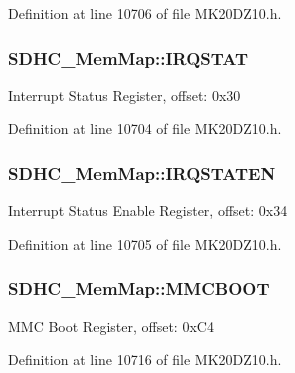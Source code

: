 Definition at line 10706 of file M\+K20\+D\+Z10.\+h.

\subsubsection[{\texorpdfstring{I\+R\+Q\+S\+T\+AT}{IRQSTAT}}]{ S\+D\+H\+C\+\_\+\+Mem\+Map\+::\+I\+R\+Q\+S\+T\+AT}\hypertarget{struct_s_d_h_c___mem_map_accf3cc2723054bbe32bb641e670d19e3}{}\label{struct_s_d_h_c___mem_map_accf3cc2723054bbe32bb641e670d19e3}
Interrupt Status Register, offset\+: 0x30 

Definition at line 10704 of file M\+K20\+D\+Z10.\+h.

\subsubsection[{\texorpdfstring{I\+R\+Q\+S\+T\+A\+T\+EN}{IRQSTATEN}}]{ S\+D\+H\+C\+\_\+\+Mem\+Map\+::\+I\+R\+Q\+S\+T\+A\+T\+EN}\hypertarget{struct_s_d_h_c___mem_map_a6bc70391d95768a1b757bf17731f5f97}{}\label{struct_s_d_h_c___mem_map_a6bc70391d95768a1b757bf17731f5f97}
Interrupt Status Enable Register, offset\+: 0x34 

Definition at line 10705 of file M\+K20\+D\+Z10.\+h.

\subsubsection[{\texorpdfstring{M\+M\+C\+B\+O\+OT}{MMCBOOT}}]{ S\+D\+H\+C\+\_\+\+Mem\+Map\+::\+M\+M\+C\+B\+O\+OT}\hypertarget{struct_s_d_h_c___mem_map_a624306ff04a5ff80059afce5d4e8cf3e}{}\label{struct_s_d_h_c___mem_map_a624306ff04a5ff80059afce5d4e8cf3e}
M\+MC Boot Register, offset\+: 0x\+C4 

Definition at line 10716 of file M\+K20\+D\+Z10.\+h.

